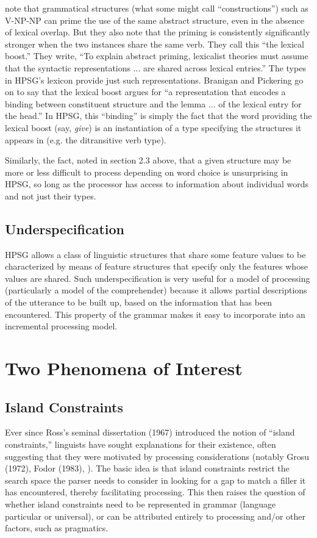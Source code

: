 \documentclass[a4paper]{article}
\begin{document}
\citet{BraniganPickering2017} note that grammatical structures (what some might call ``constructions'') such as V-NP-NP can prime the use of the same abstract structure, even in the absence of lexical overlap.  But they also note that the priming is consistently significantly stronger when the two instances share the same verb.  They call this ``the lexical boost.''  They write, ``To explain abstract
priming, lexicalist theories must assume that the syntactic
representations ...
are shared across lexical entries.'' The types in HPSG's lexicon provide just such representations.  Branigan and Pickering go on to say that the lexical boost argues for ``a representation that
encodes a binding between constituent structure and the
lemma ... of the lexical entry for the
head.''  In HPSG, this ``binding'' is simply the fact that the word providing the lexical boost (say, {\it give}) is an instantiation of a type specifying the structures it appears in (e.g. the ditransitive verb type).

Similarly, the fact, noted in section 2.3 above, that a given structure may be more or less difficult to process depending on word choice is unsurprising in HPSG, so long as the processor has access to information about individual words and not just their types.   
\subsection{Underspecification}

HPSG allows a class of linguistic structures that share some feature values to be characterized by means of feature structures that specify only the features whose values are shared.  Such underspecification is very useful for a model of processing (particularly a model of the comprehender) because it allows partial descriptions of the utterance to be built up, based on the information that has been encountered.  This property of the grammar makes it easy to incorporate into an incremental processing model.

\section{Two Phenomena of Interest}
\subsection{Island Constraints}

Ever since Ross's seminal dissertation (1967) introduced the notion of ``island constraints,'' linguists have sought explanations for their existence, often suggesting that they were motivated by processing considerations (notably Grosu (1972), Fodor (1983), \citet{Deane91}).  The basic idea is that island constraints restrict the search space the parser needs to consider in looking for a gap to match a filler it has encountered, thereby facilitating processing.  This then raises the question of whether island constraints need to be represented in grammar (language particular or universal), or can be attributed entirely to processing and/or other factors, such as pragmatics.
\end{document}
